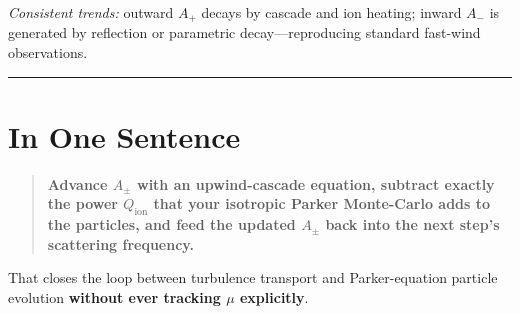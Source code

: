 \begin{tcolorbox}[colframe=black, colback=white, title=Step-by-Step Coupling Scheme]
\emph{Consistent trends:} outward \( A_+ \) decays by cascade and ion heating; inward \( A_- \) is generated by reflection or parametric decay—reproducing standard fast-wind observations.

\bigskip
\hrule
\bigskip

\section*{In One Sentence}

\begin{quote}
\textbf{Advance \( A_\pm \) with an upwind-cascade equation, subtract exactly the power \( Q_{\text{ion}} \) that your isotropic Parker Monte-Carlo adds to the particles, and feed the updated \( A_\pm \) back into the next step’s scattering frequency.}
\end{quote}

That closes the loop between turbulence transport and Parker-equation particle evolution \textbf{without ever tracking \( \mu \) explicitly}.

\end{tcolorbox}


